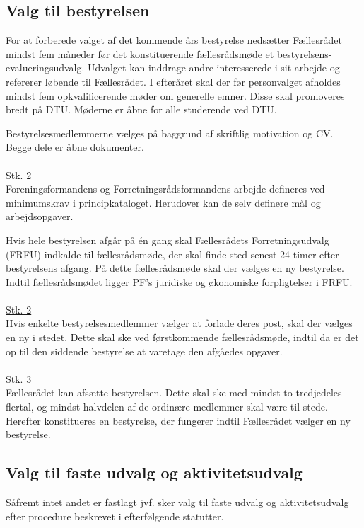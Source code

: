 \begin{list}
\begin{list}
\subsection{Valg til bestyrelsen} \label{kap:ValgTilBestyrelsen}
\item For at forberede valget af det kommende års bestyrelse nedsætter Fællesrådet mindst fem måneder før det konstituerende fællesrådsmøde et bestyrelsens-evalueringsudvalg. Udvalget kan inddrage andre interesserede i sit arbejde og refererer løbende til Fællesrådet. I efteråret skal der før personvalget afholdes mindst fem opkvalificerende møder om generelle emner. Disse skal promoveres bredt på DTU. Møderne er åbne for alle studerende ved DTU.

\item Bestyrelsesmedlemmerne vælges på baggrund af skriftlig motivation og CV. Begge dele er åbne dokumenter.\\
\\
\underline{Stk. 2}\\
Foreningsformandens og Forretningsrådsformandens arbejde defineres ved minimumskrav i principkataloget. Herudover kan de selv definere mål og arbejdsopgaver.\\

\item Hvis hele bestyrelsen afgår på én gang skal Fællesrådets Forretningsudvalg (FRFU) indkalde til fællesrådsmøde, der skal finde sted senest 24 timer efter bestyrelsens afgang. På dette fællesrådsmøde skal der vælges en ny bestyrelse. Indtil fællesrådsmødet ligger PF's juridiske og økonomiske forpligtelser i FRFU.\\
\\
\underline{Stk. 2}\\
Hvis enkelte bestyrelsesmedlemmer vælger at forlade deres post, skal der vælges en ny i stedet. Dette skal ske ved førstkommende fællesrådsmøde, indtil da er det op til den siddende bestyrelse at varetage den afgåedes opgaver.\\
\\
\underline{Stk. 3}\\
Fællesrådet kan afsætte bestyrelsen. Dette skal ske med mindst to tredjedeles flertal, og mindst halvdelen af de ordinære medlemmer skal være til stede. Herefter konstitueres en bestyrelse, der fungerer indtil Fællesrådet vælger en ny bestyrelse.

\subsection{Valg til faste udvalg og aktivitetsudvalg} \label{kap:ValgTilUdvalg}
\item Såfremt intet andet er fastlagt jvf.  sker valg til faste udvalg og aktivitetsudvalg efter procedure beskrevet i efterfølgende statutter.\\


\end{list}
\end{list}
